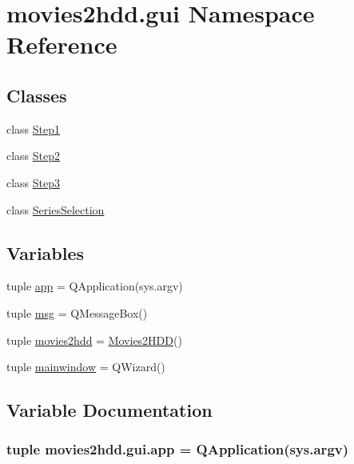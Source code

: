 \hypertarget{namespacemovies2hdd_1_1gui}{\section{movies2hdd.\-gui Namespace Reference}
\label{namespacemovies2hdd_1_1gui}
}
\subsection*{Classes}
\begin{DoxyCompactItemize}
\item 
class \hyperlink{classmovies2hdd_1_1gui_1_1_step1}{Step1}
\item 
class \hyperlink{classmovies2hdd_1_1gui_1_1_step2}{Step2}
\item 
class \hyperlink{classmovies2hdd_1_1gui_1_1_step3}{Step3}
\item 
class \hyperlink{classmovies2hdd_1_1gui_1_1_series_selection}{Series\-Selection}
\end{DoxyCompactItemize}
\subsection*{Variables}
\begin{DoxyCompactItemize}
\item 
tuple \hyperlink{namespacemovies2hdd_1_1gui_a5113ba41da39d51855bd15d8cf47d7be}{app} = Q\-Application(sys.\-argv)
\item 
tuple \hyperlink{namespacemovies2hdd_1_1gui_a04dfe049e2e7207b12600d74a0b13749}{msg} = Q\-Message\-Box()
\item 
tuple \hyperlink{namespacemovies2hdd_1_1gui_a186ac0ab862ac5332f6dfc3e927126f0}{movies2hdd} = \hyperlink{classmovies2hdd_1_1_movies2_h_d_d}{Movies2\-H\-D\-D}()
\item 
tuple \hyperlink{namespacemovies2hdd_1_1gui_ab66ae08952e6997fa86b05e376de756a}{mainwindow} = Q\-Wizard()
\end{DoxyCompactItemize}


\subsection{Variable Documentation}
\hypertarget{namespacemovies2hdd_1_1gui_a5113ba41da39d51855bd15d8cf47d7be}{
\subsubsection[{app}]{\setlength{\rightskip}{0pt plus 5cm}tuple movies2hdd.\-gui.\-app = Q\-Application(sys.\-argv)}}\label{namespacemovies2hdd_1_1gui_a5113ba41da39d51855bd15d8cf47d7be}


